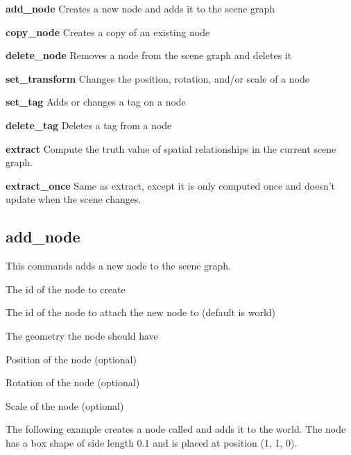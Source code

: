 \begin{description}
	\item{\textbf{add\_node}}
		Creates a new node and adds it to the scene graph
	\item{\textbf{copy\_node}}
		Creates a copy of an existing node
	\item{\textbf{delete\_node}}
		Removes a node from the scene graph and deletes it
	\item{\textbf{set\_transform}}
		Changes the position, rotation, and/or scale of a node
	\item{\textbf{set\_tag}}
		Adds or changes a tag on a node
	\item{\textbf{delete\_tag}}
		Deletes a tag from a node
	\item{\textbf{extract}}
		Compute the truth value of spatial relationships in the current scene graph.
	\item{\textbf{extract\_once}}
		Same as extract, except it is only computed once and doesn't update when the scene changes.
\end{description}


\subsection{add\_node}

This commands adds a new node to the scene graph. 

\begin{description}
	\item{} The id of the node to create
	\item{} The id of the node to attach the new node to (default is world)
	\item{} The geometry the node should have 
	\item{} Position of the node (optional)
	\item{} Rotation of the node (optional)
	\item{} Scale of the node (optional)
\end{description}

The following example creates a node called  and adds it to the world. 
The node has a box shape of side length 0.1 and is placed at position (1, 1, 0). 

